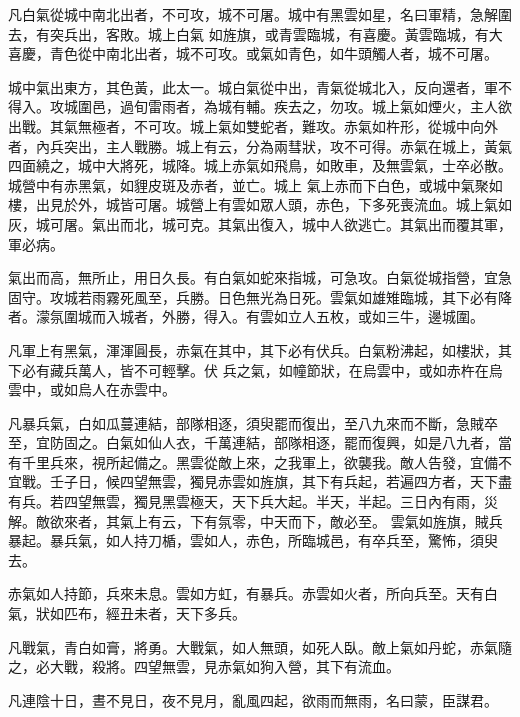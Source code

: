 \begin{pinyinscope}
 凡白氣從城中南北出者，不可攻，城不可屠。城中有黑雲如星，名曰軍精，急解圍去，有突兵出，客敗。城上白氣
 如旌旗，或青雲臨城，有喜慶。黃雲臨城，有大喜慶，青色從中南北出者，城不可攻。或氣如青色，如牛頭觸人者，城不可屠。



 城中氣出東方，其色黃，此太一。城白氣從中出，青氣從城北入，反向還者，軍不得入。攻城圍邑，過旬雷雨者，為城有輔。疾去之，勿攻。城上氣如煙火，主人欲出戰。其氣無極者，不可攻。城上氣如雙蛇者，難攻。赤氣如杵形，從城中向外者，內兵突出，主人戰勝。城上有云，分為兩彗狀，攻不可得。赤氣在城上，黃氣四面繞之，城中大將死，城降。城上赤氣如飛鳥，如敗車，及無雲氣，士卒必散。城營中有赤黑氣，如貍皮斑及赤者，並亡。城上
 氣上赤而下白色，或城中氣聚如樓，出見於外，城皆可屠。城營上有雲如眾人頭，赤色，下多死喪流血。城上氣如灰，城可屠。氣出而北，城可克。其氣出復入，城中人欲逃亡。其氣出而覆其軍，軍必病。



 氣出而高，無所止，用日久長。有白氣如蛇來指城，可急攻。白氣從城指營，宜急固守。攻城若雨霧死風至，兵勝。日色無光為日死。雲氣如雄雉臨城，其下必有降者。濛氛圍城而入城者，外勝，得入。有雲如立人五枚，或如三牛，邊城圍。



 凡軍上有黑氣，渾渾圓長，赤氣在其中，其下必有伏兵。白氣粉沸起，如樓狀，其下必有藏兵萬人，皆不可輕擊。伏
 兵之氣，如幢節狀，在烏雲中，或如赤杵在烏雲中，或如烏人在赤雲中。



 凡暴兵氣，白如瓜蔓連結，部隊相逐，須臾罷而復出，至八九來而不斷，急賊卒至，宜防固之。白氣如仙人衣，千萬連結，部隊相逐，罷而復興，如是八九者，當有千里兵來，視所起備之。黑雲從敵上來，之我軍上，欲襲我。敵人告發，宜備不宜戰。壬子日，候四望無雲，獨見赤雲如旌旗，其下有兵起，若遍四方者，天下盡有兵。若四望無雲，獨見黑雲極天，天下兵大起。半天，半起。三日內有雨，災解。敵欲來者，其氣上有云，下有氛零，中天而下，敵必至。
 雲氣如旌旗，賊兵暴起。暴兵氣，如人持刀楯，雲如人，赤色，所臨城邑，有卒兵至，驚怖，須臾去。



 赤氣如人持節，兵來未息。雲如方虹，有暴兵。赤雲如火者，所向兵至。天有白氣，狀如匹布，經丑未者，天下多兵。



 凡戰氣，青白如膏，將勇。大戰氣，如人無頭，如死人臥。敵上氣如丹蛇，赤氣隨之，必大戰，殺將。四望無雲，見赤氣如狗入營，其下有流血。



 凡連陰十日，晝不見日，夜不見月，亂風四起，欲雨而無雨，名曰蒙，臣謀君。




\end{pinyinscope}
